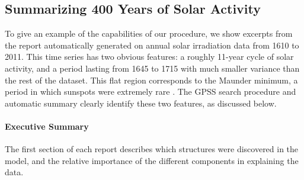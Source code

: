 \documentclass{article}
\begin{document}


\subsection{Summarizing 400 Years of Solar Activity}
\label{sec:solar}

To give an example of the capabilities of our procedure, we show excerpts from the report automatically generated on annual solar irradiation data from 1610 to 2011.  This time series has two obvious features: a roughly 11-year cycle of solar activity, and a period lasting from 1645 to 1715 with much smaller variance than the rest of the dataset.  This flat region corresponds to the Maunder minimum, a period in which sunspots were extremely rare \citep{lean1995reconstruction}.
%
The GPSS search procedure and automatic summary clearly identify these two features, as discussed below.

\paragraph{Executive Summary}

The first section of each report describes which structures were discovered in the model, and the relative importance of the different components in explaining the data.
\end{document}

